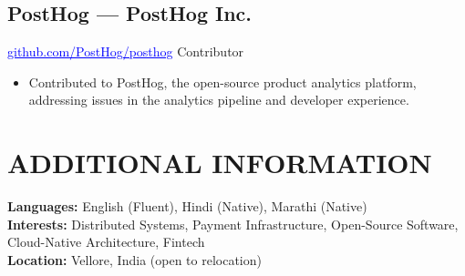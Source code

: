 \documentclass[letterpaper,10pt]{article}
\begin{document}
\vspace{2pt}
\subsection{PostHog — PostHog Inc.}
\noindent
\href{https://github.com/PostHog/posthog}{\textcolor{blue}{\underline{github.com/PostHog/posthog}}} \hfill Contributor
\begin{itemize}
  \item Contributed to PostHog, the open-source product analytics platform, addressing issues in the analytics pipeline and developer experience.
\end{itemize}


\section{ADDITIONAL INFORMATION}

\vspace{2pt}
\noindent
\textbf{Languages:} English (Fluent), Hindi (Native), Marathi (Native) \\[3pt]
\textbf{Interests:} Distributed Systems, Payment Infrastructure, Open-Source Software, Cloud-Native Architecture, Fintech \\[3pt]
\textbf{Location:} Vellore, India (open to relocation)


\end{document}
